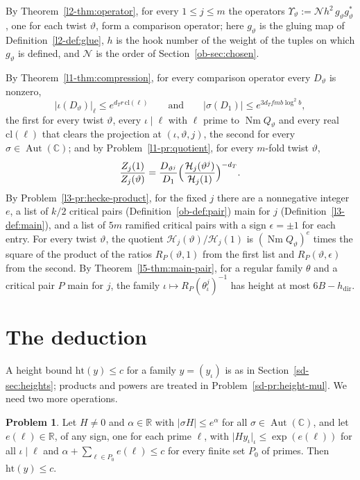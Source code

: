 \documentclass[reqno]{amsart}
\theoremstyle{definition}
\newtheorem{problem}{Problem}[section]
\theoremstyle{plain}
\newcommand{\R}{{\mathbb{R}}}
\newcommand{\C}{{\mathbb{C}}}
\newcommand{\Hc}{{\mathcal{H}}}
\newcommand{\Aut}{\operatorname{Aut}}
\newcommand{\Nm}{\operatorname{Nm}}
\newcommand{\hdir}{h_{\mathrm{dir}}}
\begin{document}
By Theorem~\ref{l2-thm:operator}, for every \(1 \le j \le m\) the operators \(\Upsilon_\vartheta := \mathcal N h^2\, g_\vartheta g_\vartheta^*\), one for each twist \(\vartheta\), form a comparison operator; here \(g_\vartheta\) is the gluing map of Definition~\ref{l2-def:glue}, \(h\) is the hook number of the weight of the tuples on which \(g_\vartheta\) is defined, and \(\mathcal N\) is the order of Section~\ref{ob-sec:chosen}.

By Theorem~\ref{l1-thm:compression}, for every comparison operator every \(D_\vartheta\) is nonzero,
\[
  \lvert\iota(D_\vartheta)\rvert_\ell \le e^{d_T r\,\mathrm{cl}(\ell)}
  \qquad\text{and}\qquad
  \lvert\sigma(D_1)\rvert \le e^{3d_T fmb\log^2 b} ,
\]
the first for every twist \(\vartheta\), every \(\iota \mid \ell\) with \(\ell\) prime to \(\Nm Q_\vartheta\) and every real \(\mathrm{cl}(\ell)\) that clears the projection at \((\iota,\vartheta,j)\), the second for every \(\sigma \in \Aut(\C)\); and by Problem~\ref{l1-pr:quotient}, for every \(m\)-fold twist \(\vartheta\),
\[
  \frac{Z_j(1)}{Z_j(\vartheta)} = \frac{D_{\vartheta^j}}{D_1}\Bigl(\frac{\Hc_j(\vartheta^j)}{\Hc_j(1)}\Bigr)^{-d_T} .
\]
By Problem~\ref{l3-pr:hecke-product}, for the fixed \(j\) there are a nonnegative integer \(e\), a list of \(k/2\) critical pairs (Definition~\ref{ob-def:pair}) main for \(j\) (Definition~\ref{l3-def:main}), and a list of \(5m\) ramified critical pairs with a sign \(\epsilon = \pm 1\) for each entry.  For every twist \(\vartheta\), the quotient \(\Hc_j(\vartheta)/\Hc_j(1)\) is \((\Nm Q_\vartheta)^e\) times the square of the product of the ratios \(R_P(\vartheta,1)\) from the first list and \(R_P(\vartheta,\epsilon)\) from the second.  By Theorem~\ref{l5-thm:main-pair}, for a regular family \(\theta\) and a critical pair \(P\) main for \(j\), the family \(\iota \mapsto R_P(\theta_\iota^j)^{-1}\) has height at most \(6B - \hdir\).

\section{The deduction}\label{sec:deduction}

A height bound \(\mathrm{ht}(y) \le c\) for a family \(y = (y_\iota)\) is as in Section~\ref{sd-sec:heights}; products and powers are treated in Problem~\ref{sd-pr:height-mul}.  We need two more operations.

\begin{problem}\label{pr:of-mul}
Let \(H \ne 0\) and \(\alpha \in \R\) with \(\lvert\sigma H\rvert \le e^\alpha\) for all \(\sigma \in \Aut(\C)\), and let \(e(\ell) \in \R\), of any sign, one for each prime \(\ell\), with \(\lvert H y_\iota\rvert_\iota \le \exp(e(\ell))\) for all \(\iota \mid \ell\) and \(\alpha + \sum_{\ell \in P_0} e(\ell) \le c\) for every finite set \(P_0\) of primes.  Then \(\mathrm{ht}(y) \le c\).
\end{problem}
\end{document}
